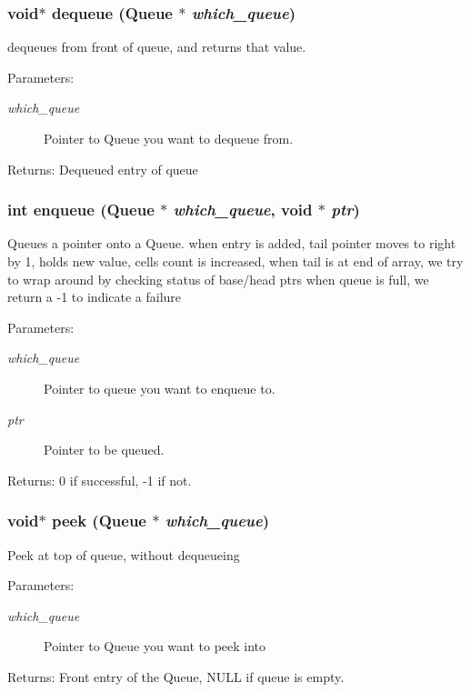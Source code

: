 \subsubsection{\setlength{\rightskip}{0pt plus 5cm}void$\ast$ dequeue (\bf{Queue} $\ast$ {\em which\_\-queue})}\label{queue_8h_f8db386ebc4c0620589024d51d83f3b5}


dequeues from front of queue, and returns that value. \begin{Desc}
\item[Parameters:]
\begin{description}
\item[{\em which\_\-queue}]Pointer to Queue you want to dequeue from. \end{description}
\end{Desc}
\begin{Desc}
\item[Returns:]Dequeued entry of queue \end{Desc}
\subsubsection{\setlength{\rightskip}{0pt plus 5cm}int enqueue (\bf{Queue} $\ast$ {\em which\_\-queue}, void $\ast$ {\em ptr})}\label{queue_8h_b5f34276406bb4ca11d16f5d4c608b33}


Queues a pointer onto a Queue. when entry is added, tail pointer moves to right by 1, holds new value, cells count is increased, when tail is at end of array, we try to wrap around by checking status of base/head ptrs when queue is full, we return a -1 to indicate a failure

\begin{Desc}
\item[Parameters:]
\begin{description}
\item[{\em which\_\-queue}]Pointer to queue you want to enqueue to. \item[{\em ptr}]Pointer to be queued. \end{description}
\end{Desc}
\begin{Desc}
\item[Returns:]0 if successful, -1 if not. \end{Desc}
\subsubsection{\setlength{\rightskip}{0pt plus 5cm}void$\ast$ peek (\bf{Queue} $\ast$ {\em which\_\-queue})}\label{queue_8h_16e4ef63ba66115658c75aa206c8977a}


Peek at top of queue, without dequeueing \begin{Desc}
\item[Parameters:]
\begin{description}
\item[{\em which\_\-queue}]Pointer to Queue you want to peek into \end{description}
\end{Desc}
\begin{Desc}
\item[Returns:]Front entry of the Queue, NULL if queue is empty. \end{Desc}
